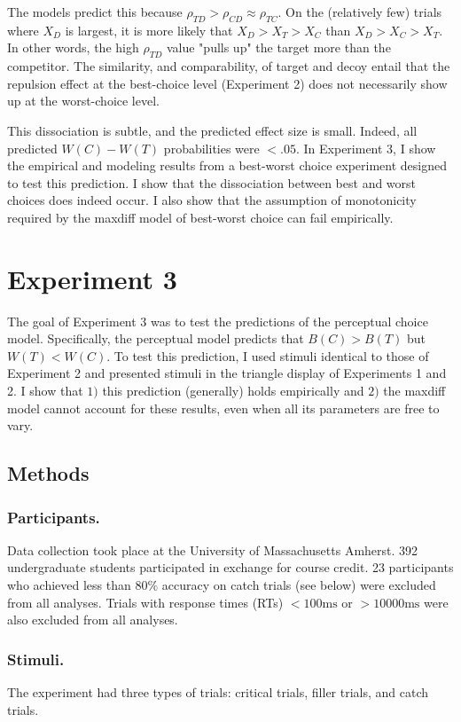 The models predict this because $\rho_{TD}>\rho_{CD}\approx\rho_{TC}$. On the (relatively few) trials where $X_{D}$ is largest, it is more likely that $X_{D}>X_{T}>X_{C}$ than $X_{D}>X_{C}>X_{T}$. In other words, the high $\rho_{TD}$ value "pulls up" the target more than the competitor. The similarity, and comparability, of target and decoy entail that the repulsion effect at the best-choice level (Experiment 2) does not necessarily show up at the worst-choice level.

This dissociation is subtle, and the predicted effect size is small. Indeed, all predicted $W(C)-W(T)$ probabilities were $<.05$. In Experiment 3, I show the empirical and modeling results from a best-worst choice experiment designed to test this prediction. I show that the dissociation between best and worst choices does indeed occur. I also show that the assumption of monotonicity required by the maxdiff model of best-worst choice can fail empirically.

\section{Experiment 3}

The goal of Experiment 3 was to test the predictions of the perceptual choice model. Specifically, the perceptual model predicts that $B(C)>B(T)$ but $W(T)<W(C)$. To test this prediction, I used stimuli identical to those of Experiment 2 and presented stimuli in the triangle display of Experiments 1 and 2.
I show that $1)$ this prediction (generally) holds empirically and $2)$ the maxdiff model cannot account for these results, even when all its parameters are free to vary. 

\subsection{Methods}

\subsubsection{Participants.}
Data collection took place at the University of Massachusetts Amherst. 392 undergraduate students participated in exchange for course credit. 23 participants who achieved less than $80\%$ accuracy on catch trials (see below) were excluded from all analyses. Trials with response times (RTs) $<100\text{ms}$ or  $>10000\text{ms}$ were also excluded from all analyses.

\subsubsection{Stimuli.}
The experiment had three types of trials: critical trials, filler trials, and catch trials. 


